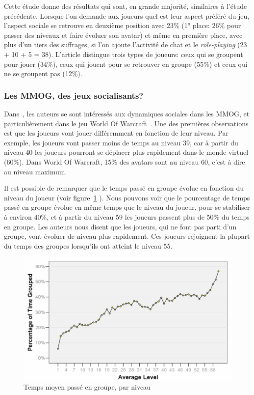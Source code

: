 Cette étude donne des résultats qui sont, en grande majorité, similaires à l'étude précédente. Lorsque l'on demande aux joueurs quel est leur aspect préféré du jeu, l'aspect sociale se retrouve en deuxième position avec 23\% (1° place: 26\% pour passer des niveaux et faire évoluer son avatar) et même en première place, avec plus d'un tiers des suffrages, si l'on ajoute l'activité de chat et le \textit{role-playing} (23 + 10 + 5 = 38). L'article distingue trois types de joueurs: ceux qui se groupent pour jouer (34\%), ceux qui jouent pour se retrouver en groupe (55\%) et ceux qui ne se groupent pas (12\%).



\subsubsection{Les MMOG, des jeux socialisants?}
\par Dans~\cite{1124834}, les auteurs se sont intéressés aux dynamiques sociales dans les MMOG, et particulièrement dans le jeu World Of Warcraft~\cite{wow}. Une des premières observations est que les joueurs vont jouer différemment en fonction de leur niveau. Par exemple, les joueurs vont passer moins de temps au niveau 39, car à partir du niveau 40 les joueurs pourront se déplacer plus rapidement dans le monde virtuel (60\%). Dans World Of Warcraft, 15\% des avatars sont au niveau 60, c'est à dire au niveau maximum.

\par Il est possible de remarquer que le temps passé en groupe évolue en fonction du niveau du joueur (voir figure~\ref{timespentgroup} ). Nous pouvons voir que le pourcentage de temps passé en groupe évolue en même temps que le niveau du joueur, pour se stabiliser à environ 40\%, et à partir du niveau 59 les joueurs passent plus de 50\% du temps en groupe. Les auteurs nous disent que les joueurs, qui ne font pas parti d'un groupe, vont évoluer de niveau plus rapidement. Ces joueurs rejoignent la plupart du temps des groupes lorsqu'ils ont atteint le niveau 55. 
	\begin{figure}[!h]
        \centering
        \includegraphics[scale=0.95]{./Ressources/Images/timespentgroup.png}
        \caption{Temps moyen passé en groupe, par niveau}
        \label{timespentgroup}
        \end{figure}

